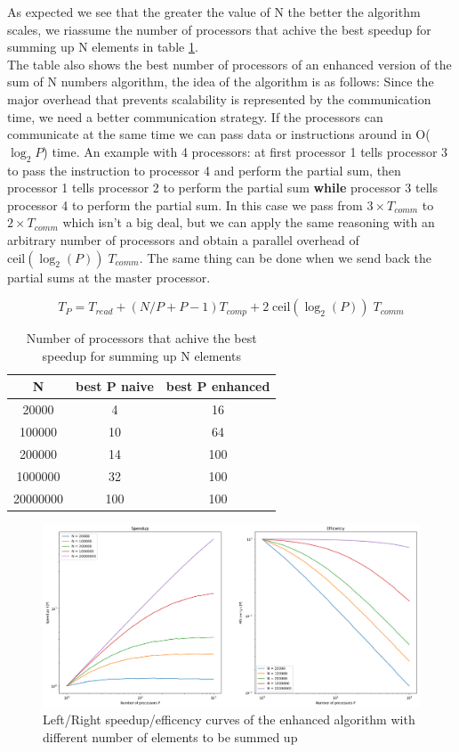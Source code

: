 \documentclass[a4paper]{article}
\begin{document}
As expected we see that the greater the value of N the better the algorithm scales, we riassume the number of processors that achive the best speedup for summing up N elements in table \ref{tab:speedup_sum}.\\
The table also shows the best number of processors of an enhanced version of the sum of N numbers algorithm, the idea of the algorithm is as follows:
Since the major overhead that prevents scalability is represented by the communication time, we need a better communication strategy. If the processors can communicate at the same time we can pass data or instructions around in O($\log_2P$) time. An example with 4 processors: at first processor 1 tells processor 3 to pass the instruction to processor 4 and perform the partial sum, then processor 1 tells processor 2 to perform the partial sum \textbf{while} processor 3 tells processor 4 to perform the partial sum. In this case we pass from $3\times T_{comm}$ to $2\times T_{comm}$ which isn't a big deal, but we can apply the same reasoning with an arbitrary number of processors and obtain a parallel overhead of $\mathrm{ceil}(\log_2(P))\;T_{comm}$. The same thing can be done when we send back the partial sums at the master processor.

\begin{equation}
    T_P = T_{read} + (N/P + P-1)T_{comp} + 2\;\mathrm{ceil}(\log_2(P))\;T_{comm}
\end{equation}

\begin{table}[h]
    \centering
    \begin{tabular}{ccc}
        N & best P naive & best P enhanced\\
        \hline\hline
        20000& 4 &16\\
        100000& 10 &64\\
        200000& 14 &100\\
        1000000& 32&100\\
        20000000& 100&100\\
        \hline
    \end{tabular}
    \caption{Number of processors that achive the best speedup for summing up N elements}
    \label{tab:speedup_sum}
\end{table}

\begin{figure}[h]
    \centering
    \includegraphics[scale=0.4]{Speedup_sum_enhanced.png}
    \caption{Left/Right speedup/efficency curves of the enhanced algorithm with different number of elements to be summed up}
    \label{fig:speedup_enhanced}
\end{figure}
\end{document}
